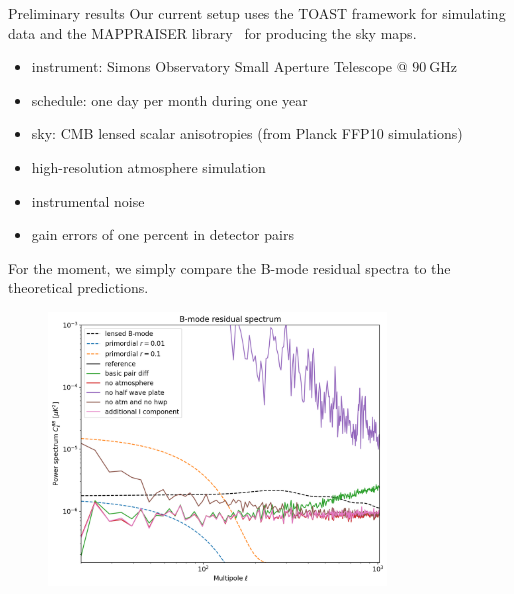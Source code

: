 \documentclass[final]{beamer}
\newlength{\colwidth}
\begin{document}
\begin{frame}[t]
\begin{columns}[t]
\begin{column}{\colwidth}
\begin{block}{Preliminary results}
        Our current setup uses the TOAST framework for simulating data and the MAPPRAISER library~\cite{ElBouhargani:2021umq} for producing the sky maps.

        \begin{itemize}
          \item instrument: Simons Observatory Small Aperture Telescope @ $\qty[mode=text]{90}{\giga\hertz}$
          \item schedule: one day per month during one year
          \item sky: CMB lensed scalar anisotropies (from Planck FFP10 simulations)
          \item high-resolution atmosphere simulation
          \item instrumental noise
          \item gain errors of one percent in detector pairs
        \end{itemize}

        For the moment, we simply compare the B-mode residual spectra to the theoretical predictions.

        \begin{figure}
          \centering
          \includegraphics[width=0.8\textwidth]{figures/comparison.png}
        \end{figure}


\end{block}
\end{column}
\end{columns}
\end{frame}
\end{document}
